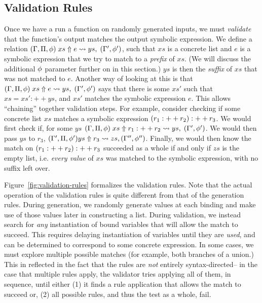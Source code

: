 \subsection{Validation Rules} \label{subsec:validation-rules}


Once we have a run a function on randomly generated inputs,
we must \textit{validate} that the function's output
matches the output symbolic expression.
We define a relation
$(\Gamma, \Pi, \phi) \; xs \Uparrow e \leadsto ys, \; (\Gamma',\phi')$,
such that $xs$ is a concrete list and $e$ is a symbolic expression
that we try to match to a \textit{prefix} of $xs$.
(We will discuss the additional $\phi$ parameter further on in this section.)
$ys$ is then the \textit{suffix} of $xs$ that was not matched to $e$.
Another way of looking at this
is that
$(\Gamma, \Pi, \phi) \; xs \Uparrow e \leadsto ys, \; (\Gamma',\phi')$
says that there is some $xs'$ such that $xs = xs' :++ ys$,
and $xs'$ matches the symbolic expression $e$.
This allows ``chaining'' together validation steps.
For example, consider checking if some concrete list $xs$ matches a symbolic expression
$(r_1 :++ r_2) :++ r_3$.
We would first check if, for some $ys$
$(\Gamma, \Pi, \phi) \; xs \Uparrow r_1 :++ r_2 \leadsto ys, \; (\Gamma',\phi')$.
We would then pass $ys$ to $r_3$,
$(\Gamma', \Pi, \phi') ys \Uparrow r_3 \leadsto zs,( \Gamma'', \phi'')$.
Finally, we would then know the match on $(r_1 :++ r_2) :++ r_3$ succeeded as a whole
if and only if $zs$ is the empty list, i.e.
\textit{every value} of $xs$ was matched to the symbolic expression,
with no suffix left over.


Figure~\ref{fig:validation-rules} formalizes the validation rules.
Note that the actual operation of the validation rules is quite different from that of the generation rules.
During generation,
we randomly generate values at each binding and make use of those values later in constructing
a list.
During validation, we instead search for \textit{any} instantiation of bound variables
that will allow the match to succeed.
This requires delaying instantiation of variables until they are \textit{used},
and can be determined to correspond to some concrete expression.
In some cases, we must explore multiple possible matches
(for example, both branches of a union.)
This in reflected in the fact that the rules are \textit{not} entirely syntax-directed--
in the case that multiple rules apply,
the validator tries applying all of them,
in sequence,
until either (1) it finds a rule application that allows the match to succeed
or, (2) all possible rules, and thus the test as a whole, fail.

